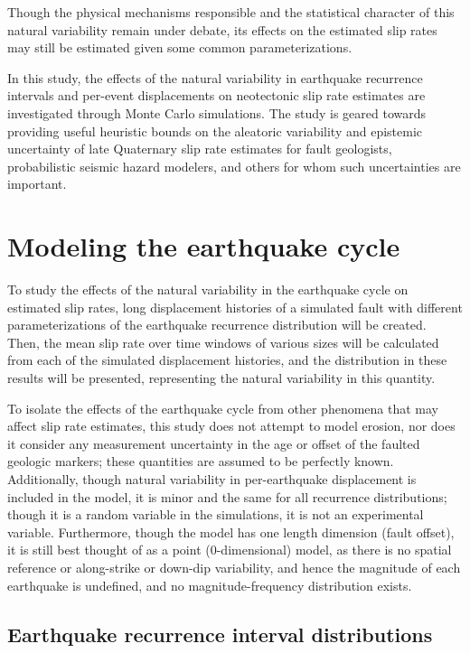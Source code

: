 \documentclass[se]{copernicus}
\begin{document}
Though the physical mechanisms responsible and the statistical character of 
this natural variability remain under debate, its effects on the estimated slip 
rates may still be estimated given some common parameterizations.

In this study, the effects of the natural variability in earthquake
recurrence intervals and per-event displacements on neotectonic slip
rate estimates are investigated through Monte Carlo simulations. The
study is geared towards providing useful heuristic bounds on the
aleatoric variability and epistemic uncertainty of late Quaternary slip rate
estimates for fault geologists, probabilistic seismic hazard modelers,
and others for whom such uncertainties are important.


\section{Modeling the earthquake cycle}\label{modeling-the-earthquake-cycle}

To study the effects of the natural variability in the earthquake cycle
on estimated slip rates, long displacement histories of a simulated
fault with different parameterizations of the earthquake recurrence
distribution will be created. Then, the mean slip rate over time windows
of various sizes will be calculated from each of the simulated
displacement histories, and the distribution in these results will be
presented, representing the natural variability in this quantity.

To isolate the effects of the earthquake cycle from other phenomena that
may affect slip rate estimates, this study does not attempt to model
erosion, nor does it consider any measurement uncertainty in the age or
offset of the faulted geologic markers; these quantities are assumed
to be perfectly known. Additionally, though natural variability in
per-earthquake displacement is included in the model, it is minor and
the same for all recurrence distributions; though it is a random variable in the
simulations, it is not an experimental variable. Furthermore, though the model
has one length dimension (fault offset), it is still best thought of as
a point (0-dimensional) model, as there is no spatial reference or
along-strike or down-dip variability, and hence the magnitude of each
earthquake is undefined, and no magnitude-frequency distribution exists.

\subsection{Earthquake recurrence interval
distributions}\label{earthquake-recurrence-interval-distributions}
\end{document}
